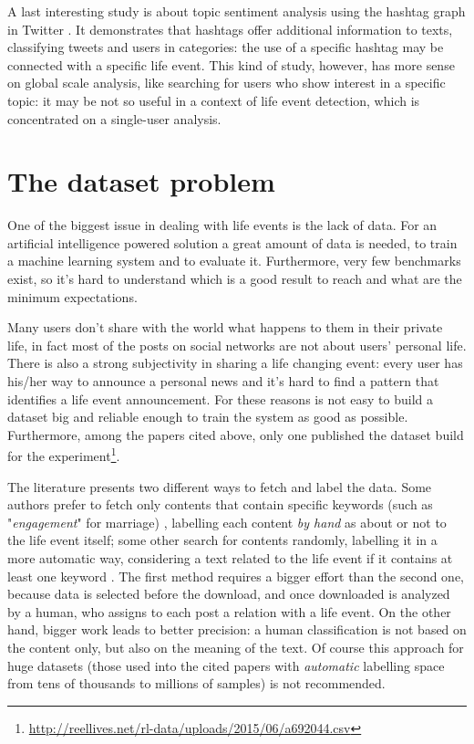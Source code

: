 A last interesting study is about topic sentiment analysis using the hashtag graph in Twitter \cite{wang2011topic}. It demonstrates that hashtags offer additional information to texts, classifying tweets and users in categories: the use of a specific hashtag may be connected with a specific life event. This kind of study, however, has more sense on global scale analysis, like searching for users who show interest in a specific topic: it may be not so useful in a context of life event detection, which is concentrated on a single-user analysis.


\section{The dataset problem}
\label{sec:dataset}
One of the biggest issue in dealing with life events is the lack of data. For an artificial intelligence powered solution a great amount of data is needed, to train a machine learning system and to evaluate it. Furthermore, very few benchmarks exist, so it's hard to understand which is a good result to reach and what are the minimum expectations.

Many users don't share with the world what happens to them in their private life, in fact most of the posts on social networks are not about users' personal life. There is also a strong subjectivity in sharing a life changing event: every user has his/her way to announce a personal news and it's hard to find a pattern that identifies a life event announcement. For these reasons is not easy to build a dataset big and reliable enough to train the system as good as possible. Furthermore, among the papers cited above, only one \cite{dickinson2015identifying} published the dataset build for the experiment\footnote{\url{http://reellives.net/rl-data/uploads/2015/06/a692044.csv}}.

The literature presents two different ways to fetch and label the data. Some authors prefer to fetch only contents that contain specific keywords (such as "\textit{engagement}" for marriage) \cite{dickinson2015identifying, khobarekar2013detecting}, labelling each content \textit{by hand} as about or not to the life event itself; some other search for contents randomly, labelling it in a more automatic way, considering a text related to the life event if it contains at least one keyword \cite{choudhury2014personal, di2013detecting, moyanolife}. The first method requires a bigger effort than the second one, because data is selected before the download, and once downloaded is analyzed by a human, who assigns to each post a relation with a life event. On the other hand, bigger work leads to better precision: a human classification is not based on the content only, but also on the meaning of the text. Of course this approach for huge datasets (those used into the cited papers with \textit{automatic} labelling space from tens of thousands to millions of samples) is not recommended. 

